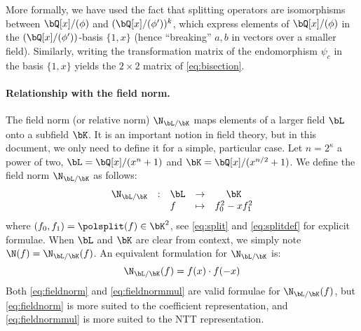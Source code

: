  More formally, we have used the fact that splitting operators are isomorphisms between $\bQ[x]/(\phi)$ and $(\bQ[x]/(\phi'))^k$, which express elements of $\bQ[x]/(\phi)$ in the $(\bQ[x]/(\phi'))$-basis $\{1,x\}$ (hence ``breaking'' $a,b$ in vectors over a smaller field). Similarly, writing the transformation matrix of the endomorphism $\psi_c$ in the basis $\{1,x\}$ yields the $2\times 2$ matrix of \eqref{eq:bisection}.

%


\paragraph{Relationship with the field norm.} The field norm (or relative norm) $\N_{\bL/\bK}$ maps elements of a larger field $\bL$ onto a subfield $\bK$. It is an important notion in field theory, but in this document, we only need to define it for a simple, particular case. Let $n = 2^\kappa$ a power of two, $\bL = \bQ[x]/(x^{n} + 1)$ and $\bK = \bQ[x]/(x^{n/2} + 1)$. We define the field norm $\N_{\bL/\bK}$ as follows:
\begin{equation}\label{eq:fieldnorm}
\begin{array}{llllc}
\N_{\bL/\bK} & : & \bL & \rightarrow & \bK \\
& & f & \mapsto & f_0^2 - x f_1^2
\end{array}
\end{equation}
where $(f_0,f_1) = \polsplit(f) \in \bK^2$, see \eqref{eq:split} and \eqref{eq:splitdef} for explicit formulae. When $\bL$ and $\bK$ are clear from context, we simply note $\N(f) = \N_{\bL/\bK}(f)$. An equivalent formulation for $\N_{\bL/\bK}$ is:
\begin{equation}\label{eq:fieldnormmul}
\N_{\bL/\bK} (f) = f(x) \cdot f(-x)
\end{equation}
Both \eqref{eq:fieldnorm} and \eqref{eq:fieldnormmul} are valid formulae for $\N_{\bL/\bK}(f)$, but \eqref{eq:fieldnorm} is more suited to the coefficient representation, and \eqref{eq:fieldnormmul} is more suited to the NTT representation.